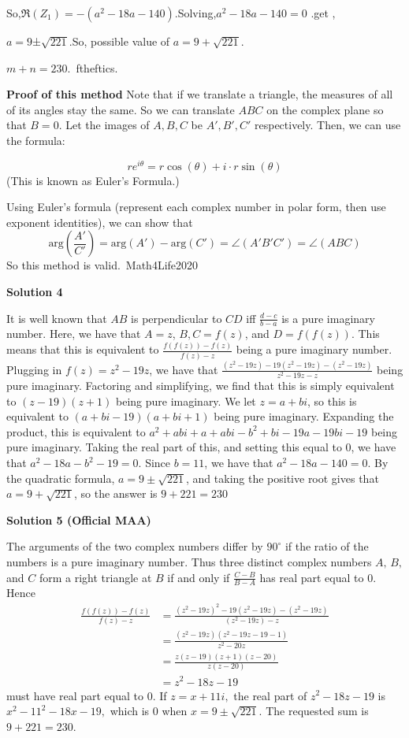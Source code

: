 \begin{enumerate}
 So,$\Re (Z_1)= -(a^2-18a-140)$.Solving,$a^2-18a-140=0$ .get ,

 $a=9$±$\sqrt{221}$.So, possible value of $a=9+\sqrt{221}$.

 $m+n=\boxed{230}$.~ftheftics.

 \textbf{Proof of this method} Note that if we translate a triangle, the measures of all of its angles stay the same. So we can translate $ABC$ on the complex plane so that $B=0$. Let the images of $A, B, C$ be $A', B', C'$ respectively. Then, we can use the formula:

 
 \[re^{i\theta}=r\cos(\theta)+i \cdot r\sin(\theta)\] (This is known as Euler's Formula.)

 Using Euler's formula (represent each complex number in polar form, then use exponent identities), we can show that 
 \[\text{arg}(\frac{A'}{C'})=\text{arg}(A')-\text{arg}(C')=\angle(A'B'C')=\angle(ABC)\] So this method is valid.~Math4Life2020

 



\textbf{Solution 4}

It is well known that $AB$ is perpendicular to $CD$ iff $\frac{d-c}{b-a}$ is a pure imaginary number. Here, we have that $A=z$, $B,C=f(z)$, and $D=f(f(z))$. This means that this is equivalent to $\frac{f(f(z))-f(z)}{f(z)-z}$ being a pure imaginary number. Plugging in $f(z)=z^2-19z$, we have that $\frac{(z^2-19z)-19(z^2-19z)-(z^2-19z)}{z^2-19z-z}$ being pure imaginary. Factoring and simplifying, we find that this is simply equivalent to $(z-19)(z+1)$ being pure imaginary. We let $z=a+bi$, so this is equivalent to $(a+bi-19)(a+bi+1)$ being pure imaginary. Expanding the product, this is equivalent to $a^2+abi+a+abi-b^2+bi-19a-19bi-19$ being pure imaginary. Taking the real part of this, and setting this equal to $0$, we have that $a^2-18a-b^2-19=0$. Since $b=11$, we have that $a^2-18a-140=0$. By the quadratic formula, $a=9 \pm \sqrt{221}$, and taking the positive root gives that $a=9+ \sqrt{221}$, so the answer is $9+221=230$




\textbf{Solution 5 (Official MAA)}

The arguments of the two complex numbers differ by $90^\circ$ if the ratio of the numbers is a pure imaginary number. Thus three distinct complex numbers $A,\,B,$ and $C$ form a right triangle at $B$ if and only if $\frac{C-B}{B-A}$ has real part equal to $0.$ Hence 
 \begin{align*} \frac{f(f(z))-f(z)}{f(z)-z}&=\frac{(z^2-19z)^2-19(z^2-19z)-(z^2-19z)}{(z^2-19z)-z}\\ &=\frac{(z^2-19z)(z^2-19z-19-1)}{z^2-20z}\\ &=\frac{z(z-19)(z+1)(z-20)}{z(z-20)} \\ &=z^2-18z-19 \end{align*}
 must have real part equal to $0.$ If $z=x+11i,$ the real part of $z^2-18z-19$ is $x^2-11^2-18x-19,$ which is $0$ when $x=9\pm\sqrt{221}.$ The requested sum is $9+221=\boxed{230}.$





\end{enumerate}
